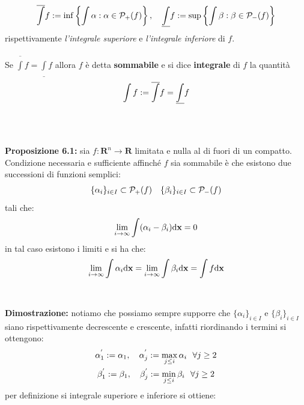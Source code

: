 \documentclass{article}
\begin{document}
\begin{gather}
    \overline{\int} f := \inf \left\{ \int \alpha : \alpha \in \mathcal{P}_+(f) \right\}, \quad \underline{\int} f := \sup \left\{ \int \beta : \beta \in \mathcal{P}_-(f) \right\} \notag
\end{gather}
rispettivamente \textit{l'integrale superiore} e \textit{l'integrale inferiore} di $f$. \\ \\
Se $\overline{\int} f = \underline{\int} f$ allora $f$ è detta \textbf{sommabile} e si dice \textbf{integrale} di $f$ la quantità
\begin{gather}
    \int f := \overline{\int} f = \underline{\int} f \notag
\end{gather}
\\ \\ \\
\textbf{Proposizione 6.1:} sia $f : \mathbf{R}^n \longrightarrow \mathbf{R}$ limitata e nulla al di fuori di un compatto. Condizione necessaria e sufficiente affinché $f$ sia sommabile è che esistono due successioni di funzioni semplici:
\begin{gather}
    \{ \alpha_i \}_{i \in I} \subset \mathcal{P}_+(f) \quad \{ \beta_i \}_{i \in I} \subset \mathcal{P}_-(f) \notag
\end{gather}
tali che:
\begin{gather}
    \lim_{i \rightarrow \infty} \int (\alpha_i - \beta_i) \mathrm{d}\mathbf{x} = 0 \notag
\end{gather}
in tal caso esistono i limiti e si ha che:
\begin{gather}
    \lim_{i \rightarrow \infty} \int \alpha_i \mathrm{d} \mathbf{x} =  \lim_{i \rightarrow \infty} \int \beta_i \mathrm{d} \mathbf{x} = \int f \mathrm{d} \mathbf{x} \notag
\end{gather}
\\ \\
\textbf{Dimostrazione:} notiamo che possiamo sempre supporre che $\{ \alpha_i \}_{i \in I}$ e $\{ \beta_i \}_{i \in I}$ siano rispettivamente decrescente e crescente, infatti riordinando i termini si ottengono:
\begin{gather}
    \alpha_1^{'} := \alpha_1, \quad \alpha_j^{'} := \max_{j \leq i} \alpha_i \ \ \forall j \geq 2 \notag \\
    \beta_1^{'} := \beta_1, \quad \beta_j^{'} := \min_{j \leq i} \beta_i \ \ \forall j \geq 2 \notag
\end{gather}
per definizione si integrale superiore e inferiore si ottiene:
\end{document}
